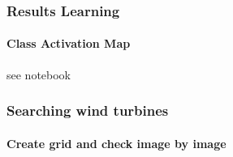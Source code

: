 \documentclass[color=usenames,dvipsnames]{beamer}
\begin{document}
\begin{frame}
\frametitle{Results Learning}
\framesubtitle{Class Activation Map}








see notebook

\end{frame}




\begin{frame}
\frametitle{Searching wind turbines}
\framesubtitle{Create grid and check image by image}


\end{frame}
\end{document}
